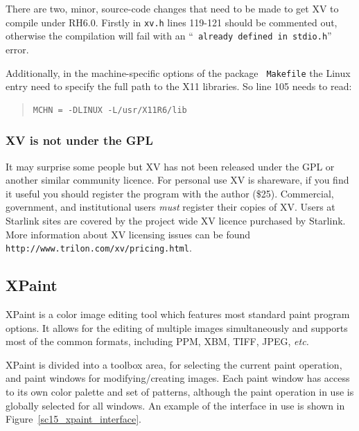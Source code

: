 \documentclass[twoside,11pt]{article}
\newcommand{\htmladdnormallink}[2]{#1}
\newcommand{\xlabel}[1]{}
\begin{document}
There are two, minor, source-code changes that need to be made to get
XV to compile under RH6.0. Firstly in {\tt xv.h} lines 119-121 should
be commented out, otherwise the compilation will fail with an ``{\tt
already defined in stdio.h}'' error. \normalsize

Additionally, in the machine-specific options of the package {\tt
Makefile} the Linux entry need to specify the full path to the X11
libraries. So line 105 needs to read:

\small
\begin{quote}
\begin{verbatim}
MCHN = -DLINUX -L/usr/X11R6/lib
\end{verbatim}
\end{quote}
\normalsize

\subsubsection{XV is {\bf not} under the GPL}

It may surprise some people but XV has not been released under the GPL
or another similar community licence. For personal use XV is
shareware, if you find it useful you should register the program with
the author (\$25). Commercial, government, and institutional users
{\em must} register their copies of XV. Users at Starlink sites are
covered by the project wide XV licence purchased by Starlink. More
information about XV licensing issues can be found
\htmladdnormallink{{\tt
http://www.trilon.com/xv/pricing.html}}{http://www.trilon.com/xv/pricing.html}.

\subsection{\xlabel{sc15_xpaint}XPaint\label{sc15_xpaint}}

\htmladdnormallink{XPaint}{http://home.worldonline.dk/~torsten/xpaint/}
is a color image editing tool which features most standard paint
program options. It allows for the editing of multiple images
simultaneously and supports most of the common formats, including PPM,
XBM, TIFF, JPEG, {\em etc.}

XPaint is divided into a toolbox area, for selecting the current paint
operation, and paint windows for modifying/creating images. Each paint
window has access to its own color palette and set of patterns,
although the paint operation in use is globally selected for all
windows. An example of the interface in use is shown in
Figure~\ref{sc15_xpaint_interface}.
\end{document}
